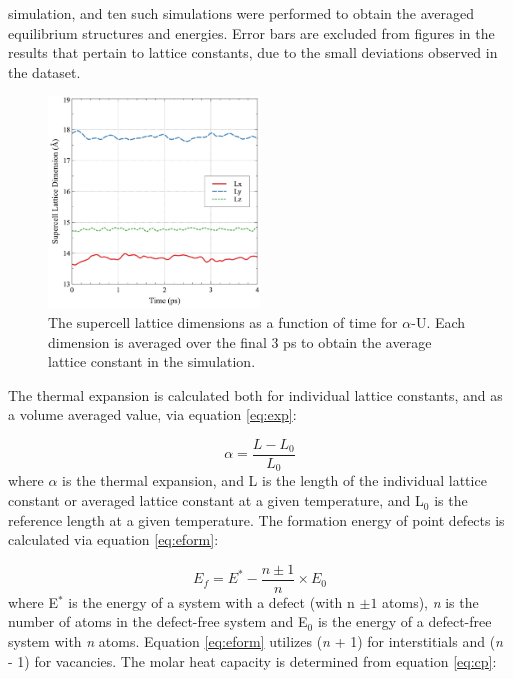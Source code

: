 \documentclass[utf8]{frontiersSCNS} %
\begin{document}
simulation, and ten such simulations were performed to obtain the averaged equilibrium structures and energies. Error bars are excluded from figures in the results that pertain to lattice constants, due to the small deviations observed in the dataset. 

 \begin{figure}[hbt]
	\centering
	\includegraphics[width=0.5\textwidth]{trajectory.jpg}
    \caption{The supercell lattice dimensions as a function of time for $\alpha$-U. Each dimension is averaged over the final 3 ps to obtain the average lattice constant in the simulation. }\label{fig:traj}
\end{figure}

The thermal expansion is calculated both for individual lattice constants, and as a volume averaged value, via equation \ref{eq:exp}:

\begin{equation}
\label{eq:exp}
\alpha = \frac{L-L_0}{L_0} 
\end{equation}where $\alpha$ is the thermal expansion, and L is the length of the individual lattice constant or averaged lattice constant at a given temperature, and L$_0$ is the reference length at a given temperature. The formation energy of point defects is calculated via equation \ref{eq:eform}: 

\begin{equation}
\label{eq:eform}
E_f = E^* - \frac{n \pm 1}{n} \times E_0
\end{equation}where E$^{*}$ is the energy of a system with a defect (with n $\pm 1$ atoms), \textit{n} is the number of atoms in the defect-free system and E$_{0}$ is the energy of a defect-free system with \textit{n} atoms. Equation \ref{eq:eform} utilizes (\textit{n} + 1) for interstitials and (\textit{n} - 1) for vacancies. The molar heat capacity is determined from equation \ref{eq:cp}:
\end{document}

